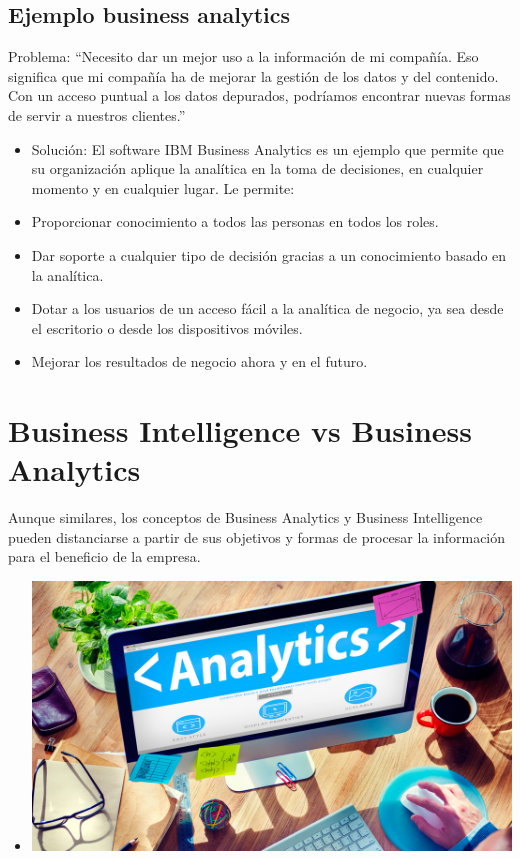 \documentclass[12pt,a4paper]{report}
\begin{document}
\subsection{Ejemplo business analytics}
Problema: “Necesito dar un mejor uso a la información de mi compañía. Eso significa que mi compañía ha de mejorar la gestión de los datos y del contenido. Con un acceso puntual a los datos depurados, podríamos encontrar nuevas formas de servir a nuestros clientes.”
\begin{itemize}
\item Solución: El software IBM Business Analytics es un ejemplo que permite que su organización aplique la analítica en la toma de decisiones, en cualquier momento y en cualquier lugar. Le permite:
\item Proporcionar conocimiento a todos las personas en todos los roles.
\item Dar soporte a cualquier tipo de decisión gracias a un conocimiento basado en la analítica.
\item Dotar a los usuarios de un acceso fácil a la analítica de negocio, ya sea desde el escritorio o desde los dispositivos móviles.
\item Mejorar los resultados de negocio ahora y en el futuro.
\end{itemize}

\section{Business Intelligence vs Business Analytics}
Aunque similares, los conceptos de Business Analytics y Business Intelligence pueden distanciarse a partir de sus objetivos y formas de procesar la información para el beneficio de la empresa.
\begin{itemize}
\item \centering
\includegraphics[width=14cm]{./images/foto1}\par\vspace{10cm}
\end{itemize}
\end{document}

